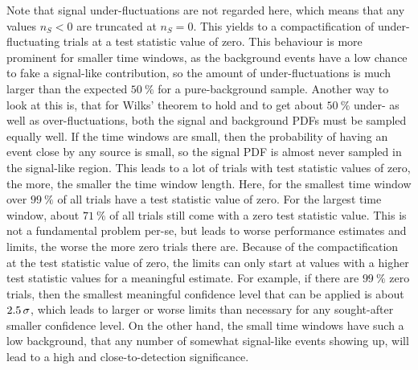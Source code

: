 Note that signal under-fluctuations are not regarded here, which means that any values $n_S < 0$ are truncated at $n_S = 0$.
This yields to a compactification of under-fluctuating trials at a test statistic value of zero.
This behaviour is more prominent for smaller time windows, as the background events have a low chance to fake a signal-like contribution, so the amount of under-fluctuations is much larger than the expected $\SI{50}{\percent}$ for a pure-background sample.
Another way to look at this is, that for Wilks' theorem to hold and to get about $\SI{50}{\percent}$ under- as well as over-fluctuations, both the signal and background PDFs must be sampled equally well.
If the time windows are small, then the probability of having an event close by any source is small, so the signal PDF is almost never sampled in the signal-like region.
This leads to a lot of trials with test statistic values of zero, the more, the smaller the time window length.
Here, for the smallest time window over $\SI{99}{\percent}$ of all trials have a test statistic value of zero.
For the largest time window, about $\SI{71}{\percent}$ of all trials still come with a zero test statistic value.
This is not a fundamental problem per-se, but leads to worse performance estimates and limits, the worse the more zero trials there are.
Because of the compactification at the test statistic value of zero, the limits can only start at values with a higher test statistic values for a meaningful estimate.
For example, if there are $\SI{99}{\percent}$ zero trials, then the smallest meaningful confidence level that can be applied is about $\num{2.5}\,\sigma$, which leads to larger or worse limits than necessary for any sought-after smaller confidence level.
On the other hand, the small time windows have such a low background, that any number of somewhat signal-like events showing up, will lead to a high and close-to-detection significance.

